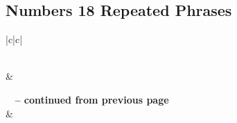 \subsection{Numbers 18 Repeated Phrases}


\normalsize
 
\begin{center}
\begin{longtable}{|c|c|}
\caption[Numbers 18 Repeated Phrases]{Numbers 18 Repeated Phrases}\label{table:Repeated Phrases Numbers 18} \\
\hline {} &  \\ \hline 
\endfirsthead
 
{{\bfseries \tablename\ \thetable{} -- continued from previous page}} \\  
\hline {} &  \\ \hline 
\endhead
 

\end{longtable}
\end{center}
